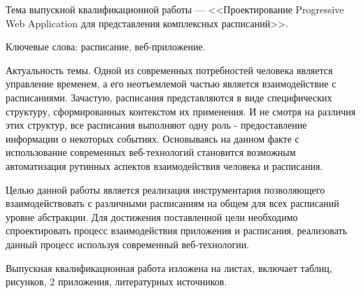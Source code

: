 
Тема выпускной квалификационной работы --- <<Проектирование Progressive Web Application для представления комплексных расписаний>>.

Ключевые слова: расписание, веб-приложение.

Актуальность темы.
Одной из современных потребностей человека является управление временем, а его неотъемлемой частью является взаимодействие с расписаниями.
Зачастую, расписания представляются в виде специфических структуру, сформированных контекстом их применения.
И не смотря на различия этих структур, все расписания выполняют одну роль - предоставление информации о некоторых событиях.
Основываясь на данном факте с использование современных веб-технологий становится возможным автоматизация рутинных аспектов взаимодействия человека и расписания.

Целью данной работы является реализация инструментария позволяющего взаимодействовать с различными расписаниям на общем для всех расписаний уровне абстракции.
Для достижения поставленной цели необходимо спроектировать процесс взаимодействия приложения и расписания, реализовать данный процесс используя современный веб-технологии.

Выпускная квалификационная работа изложена на \pageref{LastPage} листах, включает  таблиц,  рисунков, 2 приложения,  литературных источников.

\clearpage